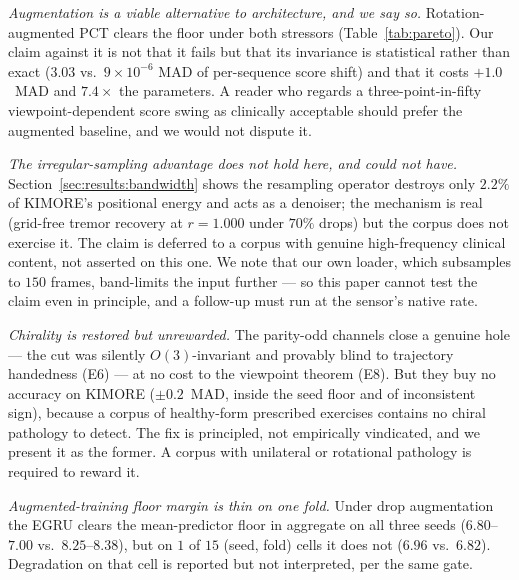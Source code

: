 \emph{Augmentation is a viable alternative to architecture, and we say so.} Rotation-augmented PCT
clears the floor under both stressors (Table~\ref{tab:pareto}). Our claim against it is not that it
fails but that its invariance is statistical rather than exact ($3.03$ vs.\ $9\times10^{-6}$ MAD of
per-sequence score shift) and that it costs $+1.0$~MAD and $7.4\times$ the parameters. A reader who
regards a three-point-in-fifty viewpoint-dependent score swing as clinically acceptable should prefer
the augmented baseline, and we would not dispute it.

\emph{The irregular-sampling advantage does not hold here, and could not have.}
Section~\ref{sec:results:bandwidth} shows the resampling operator destroys only $2.2\%$ of KIMORE's
positional energy and acts as a denoiser; the mechanism is real (grid-free tremor recovery at
$r=1.000$ under $70\%$ drops) but the corpus does not exercise it. The claim is deferred to a corpus
with genuine high-frequency clinical content, not asserted on this one. We note that our own loader,
which subsamples to $150$ frames, band-limits the input further --- so this paper cannot test the
claim even in principle, and a follow-up must run at the sensor's native rate.

\emph{Chirality is restored but unrewarded.} The parity-odd channels close a genuine hole --- the cut
was silently $O(3)$-invariant and provably blind to trajectory handedness (E6) --- at no cost to the
viewpoint theorem (E8). But they buy no accuracy on KIMORE ($\pm0.2$~MAD, inside the seed floor and of
inconsistent sign), because a corpus of healthy-form prescribed exercises contains no chiral
pathology to detect. The fix is principled, not empirically vindicated, and we present it as the
former. A corpus with unilateral or rotational pathology is required to reward it.

\emph{Augmented-training floor margin is thin on one fold.} Under drop augmentation the EGRU clears
the mean-predictor floor in aggregate on all three seeds ($6.80$--$7.00$ vs.\ $8.25$--$8.38$), but
on $1$ of $15$ (seed, fold) cells it does not ($6.96$ vs.\ $6.82$). Degradation on that cell is
reported but not interpreted, per the same gate.
